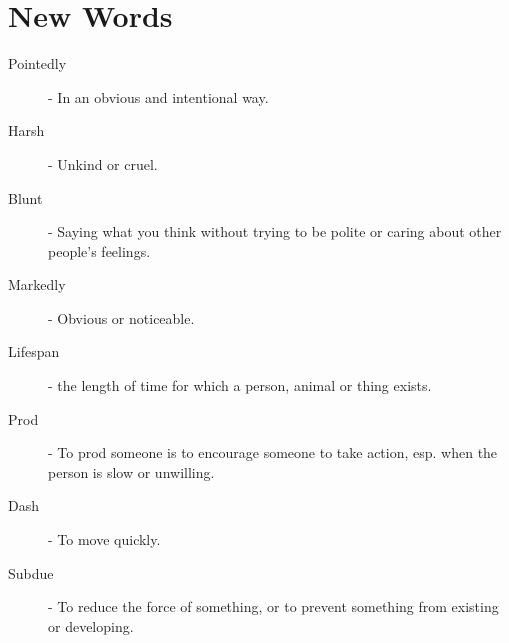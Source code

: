\documentclass[a4paper,12pt]{article}
\begin{document}
\titleTMB 
\newpage


\section{New Words}

\begin{description}



\item[Pointedly] - In an obvious and intentional way.

\item[Harsh] - Unkind or cruel.

\item[Blunt] - Saying what you think without trying to be polite or caring about other people’s feelings.

\item[Markedly] - Obvious or noticeable.

\item[Lifespan] - the length of time for which a person, animal or thing exists.

\item[Prod] - To prod someone is  to encourage someone to take action, esp. when
  the person is slow or unwilling.

\item[Dash] - To move quickly.

\item[Subdue] - To reduce the force of something, or to prevent something from existing or developing.


\end{description}
\end{document}
